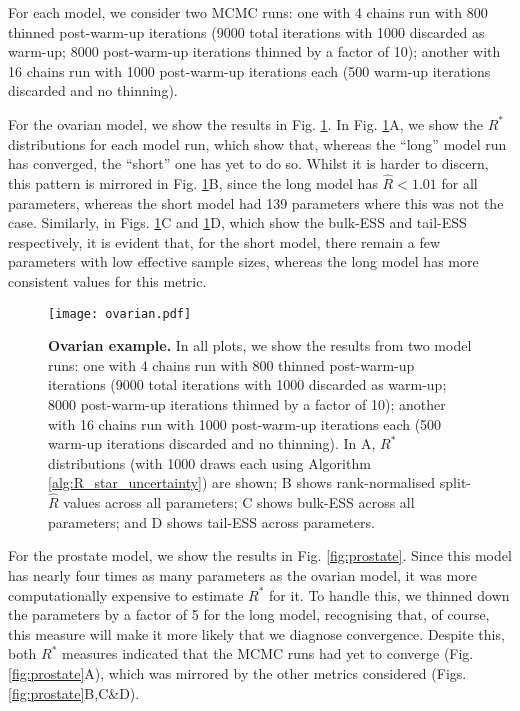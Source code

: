 \documentclass{article}
\begin{document}
For each model, we consider two MCMC runs: one with 4 chains run with 800 thinned post-warm-up iterations (9000 total iterations with 1000 discarded as warm-up; 8000 post-warm-up iterations thinned by a factor of 10); another with 16 chains run with 1000 post-warm-up iterations each (500 warm-up iterations discarded and no thinning).

For the ovarian model, we show the results in Fig. \ref{fig:ovarian}. In Fig. \ref{fig:ovarian}A, we show the $R^*$ distributions for each model run, which show that, whereas the ``long'' model run has converged, the ``short'' one has yet to do so. Whilst it is harder to discern, this pattern is mirrored in Fig. \ref{fig:ovarian}B, since the long model has $\widehat{R}<1.01$ for all parameters, whereas the short model had 139 parameters where this was not the case. Similarly, in Figs. \ref{fig:ovarian}C and \ref{fig:ovarian}D, which show the bulk-ESS and tail-ESS respectively, it is evident that, for the short model, there remain a few parameters with low effective sample sizes, whereas the long model has more consistent values for this metric.

\begin{figure}[!htb]
	\centerline{\texttt{[image: ovarian.pdf]}}
	\caption{\textbf{Ovarian example.} In all plots, we show the results from two model runs: one with 4 chains run with 800 thinned post-warm-up iterations (9000 total iterations with 1000 discarded as warm-up; 8000 post-warm-up iterations thinned by a factor of 10); another with 16 chains run with 1000 post-warm-up iterations each (500 warm-up iterations discarded and no thinning). In A, $R^*$ distributions (with 1000 draws each using Algorithm \ref{alg:R_star_uncertainty}) are shown; B shows rank-normalised split-$\widehat{R}$ values across all parameters; C shows bulk-ESS across all parameters; and D shows tail-ESS across parameters.}
	\label{fig:ovarian}
\end{figure}

For the prostate model, we show the results in Fig. \ref{fig:prostate}. Since this model has nearly four times as many parameters as the ovarian model, it was more computationally expensive to estimate $R^*$ for it. To handle this, we thinned down the parameters by a factor of 5 for the long model, recognising that, of course, this measure will make it more likely that we diagnose convergence. Despite this, both $R^*$ measures indicated that the MCMC runs had yet to converge (Fig. \ref{fig:prostate}A), which was mirrored by the other metrics considered (Figs. \ref{fig:prostate}B,C\&D).
\end{document}
